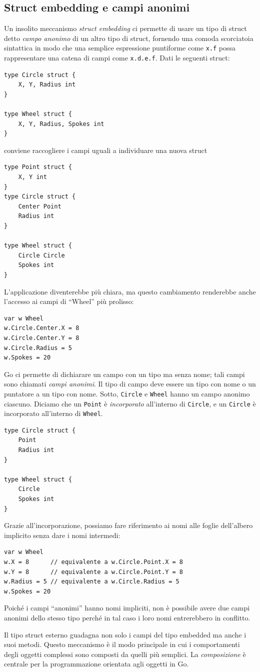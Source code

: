 \subsection{Struct embedding e campi anonimi}
\label{subsec:struct_embedding_e_campi_anonimi}%
Un insolito meccanismo \textit{struct embedding} ci permette di usare un tipo di struct detto \textit{campo anonimo} di un altro tipo di struct, fornendo una comoda scorciatoia sintattica in modo che una semplice espressione puntiforme come \verb|x.f| possa rappresentare una catena di campi come \verb|x.d.e.f|.
Dati le seguenti struct:
\begin{lstlisting}[frame=single, label={lst:lstlisting3-4-3.1}]
type Circle struct {
    X, Y, Radius int
}

type Wheel struct {
    X, Y, Radius, Spokes int
}
\end{lstlisting}
conviene raccogliere i campi uguali a individuare una nuova struct
\begin{lstlisting}[frame=single, label={lst:lstlisting3-4-3.2}]
type Point struct {
    X, Y int
}
type Circle struct {
    Center Point
    Radius int
}

type Wheel struct {
    Circle Circle
    Spokes int
}
\end{lstlisting}
L'applicazione diventerebbe più chiara, ma questo cambiamento renderebbe anche l'accesso ai campi di ``Wheel'' più prolisso:
\begin{lstlisting}[frame=single, label={lst:lstlisting3-4-3.3}]
var w Wheel
w.Circle.Center.X = 8
w.Circle.Center.Y = 8
w.Circle.Radius = 5
w.Spokes = 20
\end{lstlisting}
Go ci permette di dichiarare un campo con un tipo ma senza nome;
tali campi sono chiamati \textit{campi anonimi}.
Il tipo di campo deve essere un tipo con nome o un puntatore a un tipo con nome.
Sotto, \verb|Circle| e \verb|Wheel| hanno un campo anonimo ciascuno.
Diciamo che un \verb|Point| è \textit{incorporato} all'interno di \verb|Circle|, e un \verb|Circle| è incorporato all'interno di \verb|Wheel|.
\begin{lstlisting}[frame=single, label={lst:lstlisting3-4-3.4}]
type Circle struct {
    Point
    Radius int
}

type Wheel struct {
    Circle
    Spokes int
}
\end{lstlisting}
Grazie all'incorporazione, possiamo fare riferimento ai nomi alle foglie dell'albero implicito senza dare i nomi intermedi:
\begin{lstlisting}[frame=single,label={lst:lstlisting3-4-3.5}]
var w Wheel
w.X = 8	     // equivalente a w.Circle.Point.X = 8
w.Y = 8	     // equivalente a w.Circle.Point.Y = 8
w.Radius = 5 // equivalente a w.Circle.Radius = 5
w.Spokes = 20
\end{lstlisting}
Poiché i campi ``anonimi'' hanno nomi impliciti, non è possibile avere due campi anonimi dello stesso tipo perché in tal caso i loro nomi entrerebbero in conflitto.

Il tipo struct esterno guadagna non solo i campi del tipo embedded ma anche i suoi metodi.
Questo meccanismo è il modo principale in cui i comportamenti degli oggetti complessi sono composti da quelli più semplici.
La \textit{composizione} è centrale per la programmazione orientata agli oggetti in Go.